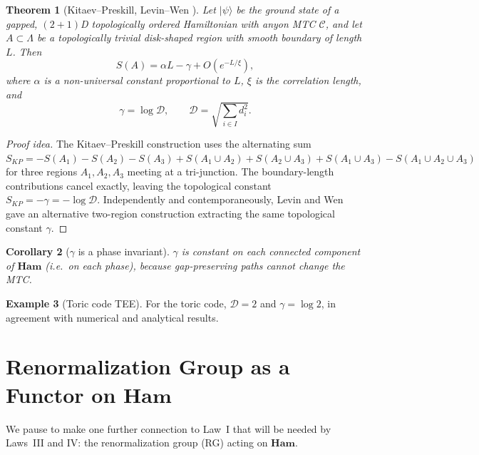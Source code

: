 \documentclass[12pt]{article}
\theoremstyle{plain}
\newtheorem{theorem}{Theorem}[section]
\newtheorem{corollary}[theorem]{Corollary}
\theoremstyle{definition}
\newtheorem{example}[theorem]{Example}
\theoremstyle{remark}
\newcommand{\Ham}{\mathbf{Ham}}
\begin{document}
\begin{theorem}[Kitaev--Preskill, Levin--Wen \cite{KitaevPreskill2006}]
\label{thm:kp}
Let $|\psi\rangle$ be the ground state of a gapped, $(2{+}1)$D topologically ordered
Hamiltonian with anyon MTC $\mathcal{C}$, and let $A\subset\Lambda$ be a topologically
trivial disk-shaped region with smooth boundary of length $L$. Then
\begin{equation}
\label{eq:kp}
S(A) = \alpha L - \gamma + O(e^{-L/\xi}),
\end{equation}
where $\alpha$ is a non-universal constant proportional to $L$, $\xi$ is the correlation
length, and
\[
\gamma = \log\mathcal{D}, \qquad \mathcal{D} = \sqrt{\sum_{i\in I}d_{i}^{2}}.
\]
\end{theorem}

\begin{proof}[Proof idea]
The Kitaev--Preskill construction uses the alternating sum
$S_{KP} = -S(A_{1})-S(A_{2})-S(A_{3})+S(A_{1}\cup A_{2})+S(A_{2}\cup A_{3})
+S(A_{1}\cup A_{3})-S(A_{1}\cup A_{2}\cup A_{3})$
for three regions $A_{1},A_{2},A_{3}$ meeting at a tri-junction. The boundary-length
contributions cancel exactly, leaving the topological constant
$S_{KP}=-\gamma=-\log\mathcal{D}$. Independently and contemporaneously, Levin and Wen
\cite{LevinWen2006} gave an alternative two-region construction extracting the same
topological constant $\gamma$.
\end{proof}

\begin{corollary}[$\gamma$ is a phase invariant]
\label{cor:gamma-invariant}
$\gamma$ is constant on each connected component of $\Ham$ (i.e.\ on each phase),
because gap-preserving paths cannot change the MTC.
\end{corollary}

\begin{example}[Toric code TEE]
For the toric code, $\mathcal{D}=2$ and $\gamma=\log 2$, in agreement with numerical
\cite{Kitaev2003} and analytical \cite{KitaevPreskill2006} results.
\end{example}

\section{\texorpdfstring{Renormalization Group as a Functor on $\Ham$}{Renormalization Group as a Functor on Ham}}
\label{sec:rg}

We pause to make one further connection to Law~I that will be needed by Laws~III and IV: the
renormalization group (RG) acting on $\Ham$.
\end{document}
